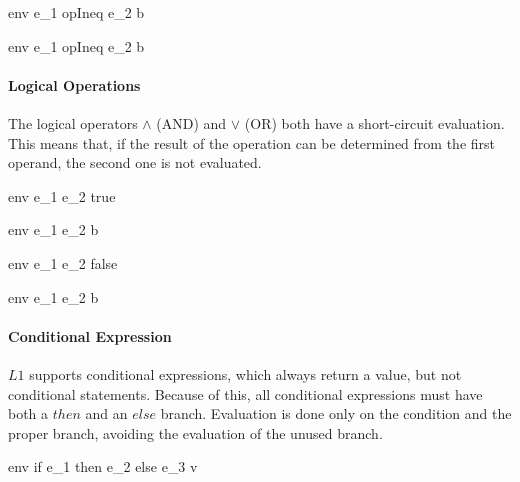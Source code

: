 \documentclass{article}
\begin{document}
\medskip

	{\mbox{env} \vdash e_1 \; opIneq \; e_2 \Downarrow b}
	
	{\mbox{env} \vdash e_1 \; opIneq \; e_2 \Downarrow b}

\paragraph{Logical Operations}
The logical operators $\wedge$ (AND) and $\vee$ (OR) both have a short-circuit evaluation. 
This means that, if the result of the operation can be determined from the first operand, the second one is not evaluated.
	
	{\mbox{env} \vdash e_1 \vee e_2 \Downarrow true}
	
	{\mbox{env} \vdash e_1 \vee e_2 \Downarrow b}
	
	{\mbox{env} \vdash e_1 \wedge e_2 \Downarrow false}
	
	{\mbox{env} \vdash e_1 \wedge e_2 \Downarrow b}
	
\paragraph{Conditional Expression}
$L1$ supports conditional expressions, which always return a value, but not conditional statements.
Because of this, all conditional expressions must have both a $then$ and an $else$ branch.
Evaluation is done only on the condition and the proper branch, avoiding the evaluation of the unused branch.
	
	{\mbox{env} \vdash if \; e_1\; then \; e_2 \; else \; e_3 \Downarrow v}
	
\end{document}
